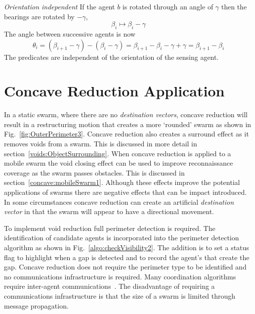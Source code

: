 \documentclass{ieeeaccess}
\begin{document}
\textit{Orientation independent}  If the agent $b$ is rotated through an angle of $\gamma$ then 
the bearings are rotated by $-\gamma$, \[ \beta_i\mapsto\beta_i-\gamma \]
The  angle between successive agents is now
\[
	\theta_i  =  (\beta_{i+1}-\gamma) - (\beta_i-\gamma)
	 = \beta_{i+1}-\beta_i-\gamma+\gamma
	 = \beta_{i+1}-\beta_i
\]
The predicates are independent of the orientation of the sensing agent.

\section{Concave Reduction Application}\label{sec:ConcaveReductionApplication}
In a static swarm, where there are no \textit{destination vectors}, concave reduction will result in a restructuring motion that creates a more `rounded' swarm as shown in Fig.~\ref{fig:OuterPerimeter3}. Concave reduction also creates a surround effect as it removes voids from a swarm. This is discussed in more detail in section~\ref{voids:ObjectSurrounding}. When concave reduction is applied to a mobile swarm the void closing effect can be used to improve reconnaissance coverage as the swarm passes obstacles. This is discussed in section~\ref{concave:mobileSwarm1}.
Although these effects improve the potential applications of swarms there are negative effects that can be impact introduced. In some circumstances concave reduction can create an artificial \textit{destination vector} in that the swarm will appear to have a directional movement. 

To implement void reduction full perimeter detection is required. The identification of candidate agents is incorporated into the perimeter detection algorithm as shown in Fig.~\ref{algo:checkVisibility2}. The addition is to set a status flag to highlight when a gap is detected and to record the agent's that create the gap. Concave reduction does not require the perimeter type to be identified and no communications infrastructure is required. Many coordination algorithms require inter-agent communications~\cite{MD:09,NIM:09,SOM:12,ZFG:13,JG:13}. The disadvantage of requiring a communications infrastructure is that the size of a swarm is limited through message propagation.
\end{document}
